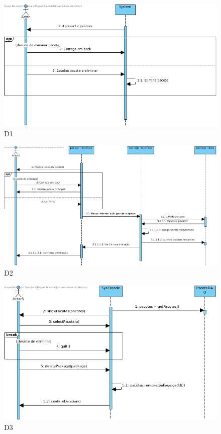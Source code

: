 \begin{figure}[H]
    \centering
    \includegraphics[width=\textwidth]{diagramas_de_sequencia/imgs/UserSystemUC5D1.jpg}
    \caption{D1}
\end{figure}
\begin{figure}[H]
    \centering
    \includegraphics[width=\textwidth]{diagramas_de_sequencia/imgs/UserSystemUC5D2.jpg}
    \caption{D2}
\end{figure}
\begin{figure}[H]
    \centering
    \includegraphics[width=\textwidth]{diagramas_de_sequencia/imgs/UserSystemUC5D3.jpg}
    \caption{D3}
\end{figure}

